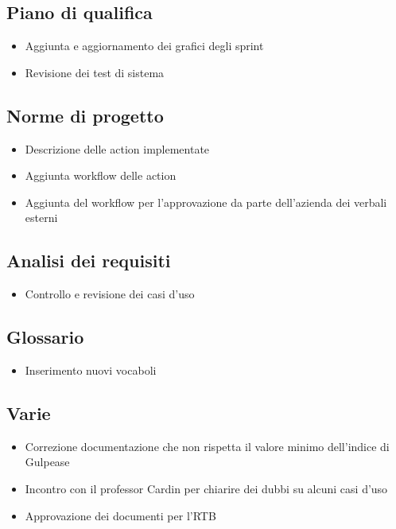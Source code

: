 \subsection{Piano di qualifica}
\begin{itemize}
    \item Aggiunta e aggiornamento dei grafici degli sprint
    \item Revisione dei test di sistema
\end{itemize}

\subsection{Norme di progetto}
\begin{itemize}
    \item Descrizione delle action implementate
    \item Aggiunta workflow delle action
    \item Aggiunta del workflow per l'approvazione da parte dell'azienda dei verbali esterni
\end{itemize}

\subsection{Analisi dei requisiti}
\begin{itemize}
    \item Controllo e revisione dei casi d'uso
\end{itemize}

\subsection{Glossario}
\begin{itemize}
    \item Inserimento nuovi vocaboli
\end{itemize}

\subsection{Varie}
\begin{itemize}
    \item Correzione documentazione che non rispetta il valore minimo dell'indice di Gulpease
    \item Incontro con il professor Cardin per chiarire dei dubbi su alcuni casi d'uso
    \item Approvazione dei documenti per l'RTB
\end{itemize}
